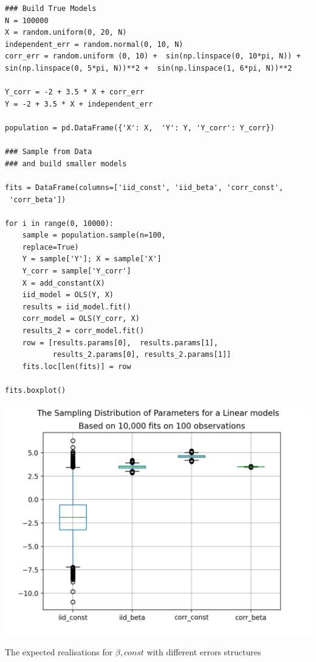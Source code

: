 \documentclass{tufte-handout}
\begin{document}
\begin{verbatim}
### Build True Models
N = 100000
X = random.uniform(0, 20, N)
independent_err = random.normal(0, 10, N)
corr_err = random.uniform (0, 10) +  sin(np.linspace(0, 10*pi, N)) +
sin(np.linspace(0, 5*pi, N))**2 +  sin(np.linspace(1, 6*pi, N))**2

Y_corr = -2 + 3.5 * X + corr_err
Y = -2 + 3.5 * X + independent_err

population = pd.DataFrame({'X': X,  'Y': Y, 'Y_corr': Y_corr})

### Sample from Data 
### and build smaller models

fits = DataFrame(columns=['iid_const', 'iid_beta', 'corr_const', 
 'corr_beta'])
 
for i in range(0, 10000):
    sample = population.sample(n=100, 
    replace=True)
    Y = sample['Y']; X = sample['X']
    Y_corr = sample['Y_corr']
    X = add_constant(X)
    iid_model = OLS(Y, X)
    results = iid_model.fit()
    corr_model = OLS(Y_corr, X)
    results_2 = corr_model.fit()
    row = [results.params[0],  results.params[1], 
           results_2.params[0], results_2.params[1]]
    fits.loc[len(fits)] = row
    
fits.boxplot()
\end{verbatim}

\begin{marginfigure}
  \includegraphics[width=\linewidth]{../Expectation/Plots/distribution_of_beta1.png}
  \caption{The expected realisations for $\beta, const$ with different errors structures}
\end{marginfigure}
\end{document}
